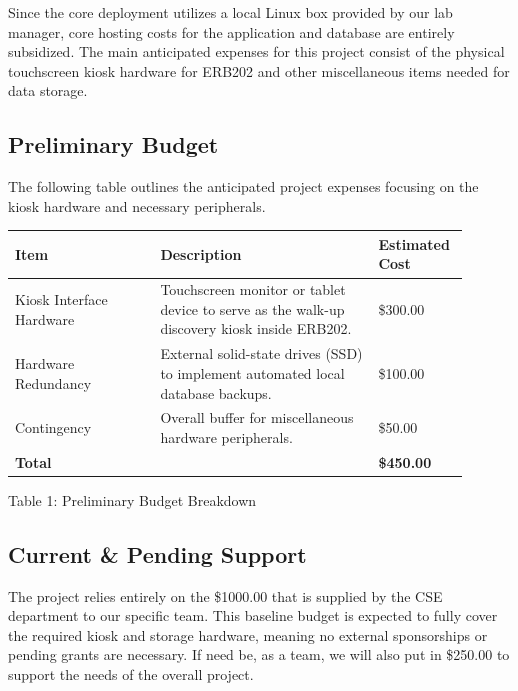 Since the core deployment utilizes a local Linux box provided by our lab manager, core hosting costs for the application and database are entirely subsidized. The main anticipated expenses for this project consist of the physical touchscreen kiosk hardware for ERB202 and other miscellaneous items needed for data storage.

\subsection{Preliminary Budget}
The following table outlines the anticipated  project expenses focusing on the kiosk hardware and necessary peripherals.

\begin{center}
\begin{tabular}{|p{0.3\linewidth}|p{0.45\linewidth}|p{0.15\linewidth}|}
\hline
\textbf{Item} & \textbf{Description} & \textbf{Estimated Cost} \\ \hline
Kiosk Interface Hardware & Touchscreen monitor or tablet device to serve as the walk-up discovery kiosk inside ERB202. & \$300.00 \\ \hline
Hardware Redundancy & External solid-state drives (SSD) to implement automated local database backups. & \$100.00 \\ \hline
Contingency & Overall buffer for miscellaneous hardware peripherals. & \$50.00 \\ \hline
\textbf{Total} & & \textbf{\$450.00} \\ \hline
\end{tabular}

\vspace{0.5em}
\small{Table 1: Preliminary Budget Breakdown}
\end{center}

\subsection{Current \& Pending Support}
The project relies entirely on the \$1000.00  that is supplied by the CSE department to our specific team. This baseline budget is expected to fully cover the required kiosk and storage hardware, meaning no external sponsorships or pending grants are necessary. If need be, as a team, we will also put in \$250.00  to support the needs of the overall project.